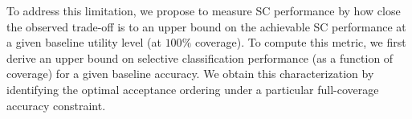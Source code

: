 To address this limitation, %
we propose to measure SC performance by how close the observed trade-off is to an upper bound on the achievable SC performance at a given baseline utility level (at $100\%$ coverage). To compute this metric, we first derive an upper bound on selective classification performance (as a function of coverage) for a given baseline accuracy. We obtain this characterization by identifying the optimal acceptance ordering under a particular full-coverage accuracy constraint. %

